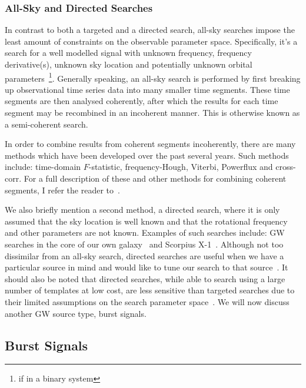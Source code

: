 \subsubsection{All-Sky and Directed Searches}

In contrast to both a targeted and a directed search, all-sky searches
impose the least amount of constraints on the observable 
parameter space. Specifically, 
it's a search for a well modelled signal with unknown frequency, 
frequency derivative(s), unknown sky location and potentially 
unknown orbital parameters~\footnote{ 
if in a binary system}. Generally speaking, an all-sky search is performed by first breaking up observational time series data into many smaller 
time segments. These time segments are then analysed coherently, 
after which the results for each time segment may be recombined in an incoherent manner. This is otherwise known as a semi-coherent search.

In order to combine results from coherent segments incoherently, there
are many methods which have been developed 
over the past several years. Such methods include: 
time-domain $F$-statistic, frequency-Hough, Viterbi, Powerflux 
and cross-corr. For a 
full description of these and other methods for combining coherent 
segments, I refer the 
reader to~\cite{PhysRevD.94.124010}. 

We also briefly 
mention a second method, a directed search, where it is only assumed that 
the sky location is well known and that the rotational frequency and 
other parameters are not known. Examples of such 
searches include: \ac{GW} searches in the core of our own  galaxy~\cite{2013PhRvD..88j2002A} and Scorpius 
X-1~\cite{2021ApJ...906L..14Z}. Although not too dissimilar from an 
all-sky search, directed searches are useful when we have a 
particular source in mind and would like to tune our search to 
that source~\cite{2016CQGra..33j5017M}. It should also be noted that directed searches, while able to search using a large number of templates at low 
cost, are less sensitive than targeted searches due to their limited 
assumptions on the search parameter space~\cite{2019PhRvD..99l2002A}. 
We will now discuss another \ac{GW} source type, burst signals.

\subsection{Burst Signals}\label{subsec:burst_sig}

